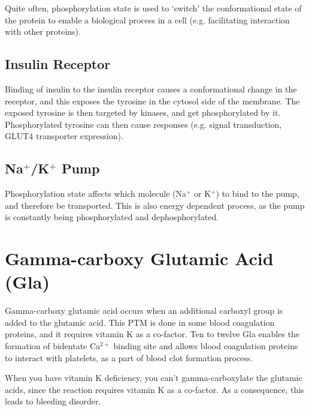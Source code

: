 Quite often, phosphorylation state is used to `switch' the conformational state of the protein to enable a biological process in a cell (e.g. facilitating interaction with other proteins).

\subsection{Insulin Receptor}

Binding of insulin to the insulin receptor causes a conformational change in the receptor, and this exposes the tyrosine in the cytosol side of the membrane.
The exposed tyrosine is then targeted by kinases, and get phosphorylated by it.
Phosphorylated tyrosine can then cause responses (e.g. signal transduction, GLUT4 transporter expression).

\begin{center}
\end{center}

\subsection{Na$^+$/K$^+$ Pump}

Phosphorylation state affects which molecule (Na$^+$ or K$^+$) to bind to the pump, and therefore be transported.
This is also energy dependent process, as the pump is constantly being phosphorylated and dephosphorylated.

\begin{center}
\end{center}

\section{Gamma-carboxy Glutamic Acid (Gla)}

Gamma-carboxy glutamic acid occurs when an additional carboxyl group is added to the glutamic acid.
This PTM is done in some blood coagulation proteins, and it requires vitamin K as a co-factor.
Ten to twelve Gla enables the formation of bidentate Ca$^{2+}$ binding site and allows blood coagulation proteins to interact with platelets, as a part of blood clot formation process.

When you have vitamin K deficiency, you can't gamma-carboxylate the glutamic acids, since the reaction requires vitamin K as a co-factor.
As a consequence, this leads to bleeding disorder.

